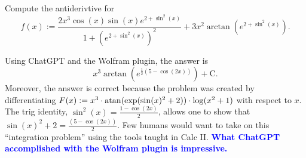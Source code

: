 \bigskip





\begin{example} Compute the antiderivtive for 
$$ f(x):=
\frac{2  x^{3 } \cos\left( x \right) \sin\left( x \right) e^{2  + \sin^{2 }\left( x \right)}}{1  + \left( e^{2  + \sin^{2 }\left( x \right)} \right)^{2 }} + 3  x^{2 } \arctan\left( e^{2  + \sin^{2 }\left( x \right)} \right).
$$    
\end{example}

\solution Using ChatGPT and the Wolfram plugin, the answer is 
\[ x^3 \arctan\left(e^{\frac{1}{2} (5 - \cos(2x))}\right) + \text{C}. \]
Moreover, the answer is correct because the problem was created by differentiating $F(x):= x^3  \cdot \mathrm{atan}(\exp(\sin(x)^2 + 2)) \cdot \log(x^2 + 1) $ with respect to $x$. The trig identity,  \( \sin^2(x) = \frac{1 - \cos(2x)}{2} \), allows one to show that $\sin(x)^2 + 2 = \frac{(5 - \cos(2x))}{2}$. Few humans would want to take on this ``integration problem'' using the tools taught in Calc II. \textcolor{blue}{\bf What ChatGPT accomplished with the Wolfram plugin is impressive.}

\Qed

\bigskip

